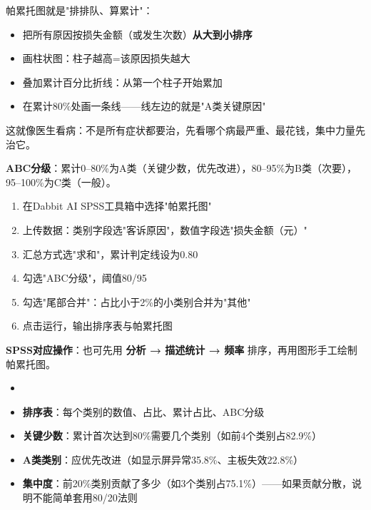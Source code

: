 \begin{algoprinciple}
帕累托图就是"排排队、算累计"：

\begin{itemize}
    \item 把所有原因按损失金额（或发生次数）\textbf{从大到小排序}
    \item 画柱状图：柱子越高=该原因损失越大
    \item 叠加累计百分比折线：从第一个柱子开始累加
    \item 在累计80\%处画一条线——线左边的就是"A类关键原因"
\end{itemize}

这就像医生看病：不是所有症状都要治，先看哪个病最严重、最花钱，集中力量先治它。

\textbf{ABC分级}：累计0--80\%为A类（关键少数，优先改进），80--95\%为B类（次要），95--100\%为C类（一般）。
\end{algoprinciple}

\begin{algosposs}
\begin{enumerate}
    \item 在Dabbit AI SPSS工具箱中选择"帕累托图"
    \item 上传数据：类别字段选"客诉原因"，数值字段选"损失金额（元）"
    \item 汇总方式选"求和"，累计判定线设为0.80
    \item 勾选"ABC分级"，阈值80/95
    \item 勾选"尾部合并"：占比小于2\%的小类别合并为"其他"
    \item 点击运行，输出排序表与帕累托图
\end{enumerate}

\textbf{SPSS对应操作}：也可先用 \textbf{分析 → 描述统计 → 频率} 排序，再用图形手工绘制帕累托图。
\end{algosposs}

\begin{algoresult}
\begin{itemize}
    \item \item \textbf{排序表}：每个类别的数值、占比、累计占比、ABC分级
    \item \textbf{关键少数}：累计首次达到80\%需要几个类别（如前4个类别占82.9\%）
    \item \textbf{A类类别}：应优先改进（如显示屏异常35.8\%、主板失效22.8\%）
    \item \textbf{集中度}：前20\%类别贡献了多少（如3个类别占75.1\%）——如果贡献分散，说明不能简单套用80/20法则
\end{itemize}
\end{algoresult}

